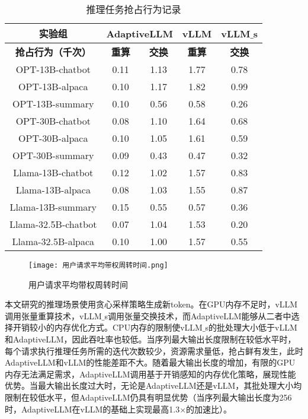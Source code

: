\begin{table}[H]
  \centering
  \caption{推理任务抢占行为记录}
  \label{Table:推理任务抢占行为记录}
  \renewcommand{\arraystretch}{1.3}
  \small
  \begin{tabular}{c c c c c}
    \toprule
    \textbf{实验组} & \multicolumn{2}{c}{\textbf{AdaptiveLLM}} & \textbf{vLLM} & \textbf{vLLM$\_$s} \\
    \midrule
    \textbf{抢占行为（千次）} & \textbf{重算} & \textbf{交换} & \textbf{重算} & \textbf{交换} \\
    \midrule
    OPT-13B-chatbot & 0.11 & 1.13 & 1.77 & 0.78 \\
    OPT-13B-alpaca & 0.10 & 1.17 & 1.82 & 0.99 \\
    OPT-13B-summary & 0.10 & 0.56 & 0.58 & 0.26 \\
    OPT-30B-chatbot & 0.08 & 1.10 & 1.64 & 0.68 \\
    OPT-30B-alpaca & 0.10 & 1.05 & 1.61 & 0.59 \\
    OPT-30B-summary & 0.09 & 0.43 & 0.47 & 0.32 \\
    Llama-13B-chatbot & 0.12 & 1.02 & 1.57 & 0.83 \\
    Llama-13B-alpaca & 0.08 & 1.03 & 1.55 & 0.87 \\
    Llama-13B-summary & 0.15 & 0.55 & 0.57 & 0.36 \\
    Llama-32.5B-chatbot & 0.07 & 1.04 & 1.53 & 0.20 \\
    Llama-32.5B-alpaca & 0.10 & 1.00 & 1.57 & 0.55 \\
    \bottomrule
  \end{tabular}
\end{table}

\begin{figure*}[!htbp]
  \centering
  \texttt{[image: 用户请求平均带权周转时间.png]}
  \caption{用户请求平均带权周转时间}
  \label{Fig:平均带权周转时间}
\end{figure*}

本文研究的推理场景使用贪心采样策略生成新token。在GPU内存不足时，vLLM调用张量重算技术，vLLM$\_$s调用张量交换技术，而AdaptiveLLM能够从二者中选择开销较小的内存优化方式。CPU内存的限制使vLLM$\_$s的批处理大小低于vLLM和AdaptiveLLM，因此吞吐率也较低。当序列最大输出长度限制在较低水平时，每个请求执行推理任务所需的迭代次数较少，资源需求量低，抢占鲜有发生，此时AdaptiveLLM和vLLM的性能差距不大。随着最大输出长度的增加，有限的GPU内存无法满足需求，AdaptiveLLM调用基于开销感知的内存优化策略，展现性能优势。当最大输出长度过大时，无论是AdaptiveLLM还是vLLM，其批处理大小均限制在较低水平，但AdaptiveLLM仍具有明显优势（当序列最大输出长度为256时，AdaptiveLLM在vLLM的基础上实现最高1.3$\times$的加速比）。

